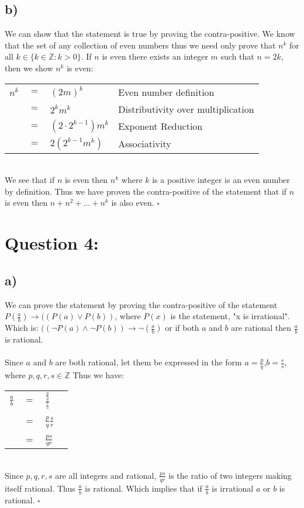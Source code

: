 \documentclass{article}
\begin{document}
\subsection*{b)}
We can show that the statement is true by proving the contra-positive. We know that the set of any collection of even numbers thus we need only prove that $n^k$ for all $k \in \{k\in\mathbb{Z}: k > 0\}$. If $n$ is even there exists an integer $m$ such that $n=2k$, then we show $n^k$ is even:
\begin{table}[htp]
    \centering
    \begin{tabular}{ccll}
    $n^k$&$=$& $(2m)^k$&Even number definition\\
    &$=$&$2^km^k$ & Distributivity over multiplication\\
    &$=$&$(2\cdot2^{k-1})m^k$ & Exponent Reduction\\
    &$=$&$2(2^{k-1}m^k)$ & Associativity
    \end{tabular}
\end{table} \\
We see that if $n$ is even then $n^k$ where $k$ is a positive integer is an even number by definition. Thus we have proven the contra-positive of the statement that if $n$ is even then $n+n^2+\dots+n^k$ is also even. $\square$

\newpage
\section*{Question 4:}
\subsection*{a)}
We can prove the statement by proving the contra-positive of the statement $P(\frac{a}{b}) \rightarrow ((P(a)\lor P(b))$, where $P(x)$ is the statement, "x is irrational". Which is: $((\lnot P(a)\land \lnot P(b)) \rightarrow \lnot(\frac{a}{b})$ or if both $a$ and $b$ are rational then $\frac{a}{b}$ is rational.\\\\
Since $a$ and $b$ are both rational, let them be expressed in the form $a=\frac{p}{q}$,$b=\frac{r}{s}$, where $p,q,r,s\in\mathbb{Z}$ Thus we have:
\begin{table}[htp]
    \centering
    \begin{tabular}{ccll}
        $\frac{a}{b}$&$=$&$\frac{\frac{p}{q}}{\frac{r}{s}}$ &\\
        & & &\\
        &$=$& $\frac{p}{q}\frac{s}{r}$&\\
        & & &\\
        &$=$& $\frac{ps}{qr}$&
    \end{tabular}
\end{table} \\
Since $p,q,r,s$ are all integers and rational,  $\frac{ps}{qr}$ is the ratio of two integers making itself rational. Thus $\frac{a}{b}$ is rational. Which implies that if $\frac{a}{b}$ is irrational $a$ or $b$ is rational. $\square$
\end{document}
